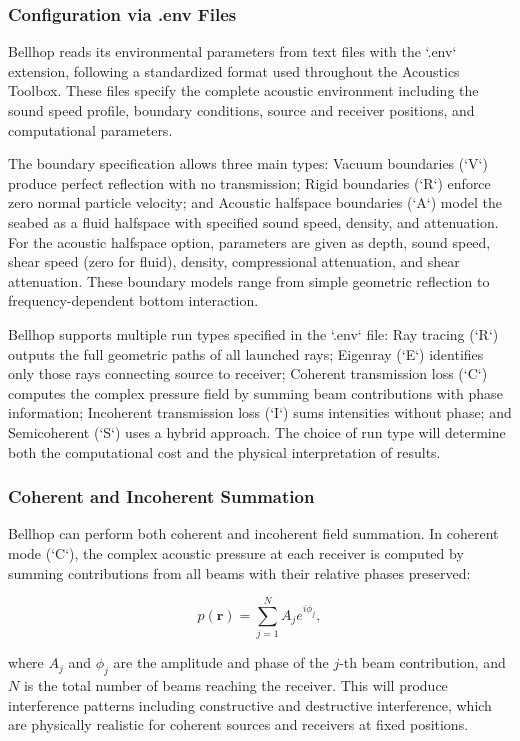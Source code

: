 \documentclass[fleqn]{jaes}
\begin{document}
\subsubsection{Configuration via .env Files}

Bellhop reads its environmental parameters from text files with the `.env` extension, following a standardized format used throughout the Acoustics Toolbox. These files specify the complete acoustic environment including the sound speed profile, boundary conditions, source and receiver positions, and computational parameters.

The boundary specification allows three main types: Vacuum boundaries (`V`) produce perfect reflection with no transmission; Rigid boundaries (`R`) enforce zero normal particle velocity; and Acoustic halfspace boundaries (`A`) model the seabed as a fluid halfspace with specified sound speed, density, and attenuation. For the acoustic halfspace option, parameters are given as depth, sound speed, shear speed (zero for fluid), density, compressional attenuation, and shear attenuation. These boundary models range from simple geometric reflection to frequency-dependent bottom interaction.

Bellhop supports multiple run types specified in the `.env` file: Ray tracing (`R`) outputs the full geometric paths of all launched rays; Eigenray (`E`) identifies only those rays connecting source to receiver; Coherent transmission loss (`C`) computes the complex pressure field by summing beam contributions with phase information; Incoherent transmission loss (`I`) sums intensities without phase; and Semicoherent (`S`) uses a hybrid approach. The choice of run type will determine both the computational cost and the physical interpretation of results.

\subsubsection{Coherent and Incoherent Summation}

Bellhop can perform both coherent and incoherent field summation. In coherent mode (`C`), the complex acoustic pressure at each receiver is computed by summing contributions from all beams with their relative phases preserved:

\begin{equation}
p(\mathbf{r}) = \sum_{j=1}^{N} A_j e^{i\phi_j},
\end{equation}

where $A_j$ and $\phi_j$ are the amplitude and phase of the $j$-th beam contribution, and $N$ is the total number of beams reaching the receiver. This will produce interference patterns including constructive and destructive interference, which are physically realistic for coherent sources and receivers at fixed positions.
\end{document}
